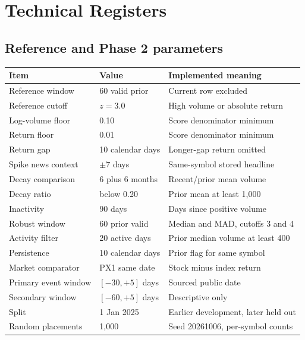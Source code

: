 \chapter{Technical Registers}

\section{Reference and Phase 2 parameters}
\begin{longtable}{@{}p{48mm}p{34mm}p{65mm}@{}}
\toprule Item & Value & Implemented meaning\\\midrule\endhead
Reference window & 60 valid prior & Current row excluded\\
Reference cutoff & $z=3.0$ & High volume or absolute return\\
Log-volume floor & 0.10 & Score denominator minimum\\
Return floor & 0.01 & Score denominator minimum\\
Return gap & 10 calendar days & Longer-gap return omitted\\
Spike news context & $\pm7$ days & Same-symbol stored headline\\
Decay comparison & 6 plus 6 months & Recent/prior mean volume\\
Decay ratio & below 0.20 & Prior mean at least 1,000\\
Inactivity & 90 days & Days since positive volume\\
Robust window & 60 prior valid & Median and MAD, cutoffs 3 and 4\\
Activity filter & 20 active days & Prior median volume at least 400\\
Persistence & 10 calendar days & Prior flag for same symbol\\
Market comparator & PX1 same date & Stock minus index return\\
Primary event window & $[-30,+5]$ days & Sourced public date\\
Secondary window & $[-60,+5]$ days & Descriptive only\\
Split & 1 Jan 2025 & Earlier development, later held out\\
Random placements & 1,000 & Seed 20261006, per-symbol counts\\
\bottomrule
\end{longtable}

